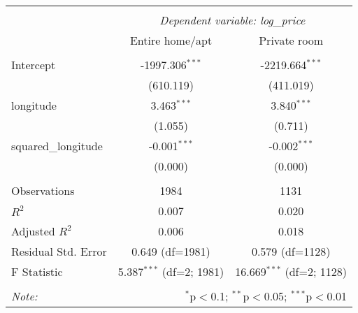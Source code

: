 \begin{table}[!htbp] \centering
\begin{tabular}{@{\extracolsep{5pt}}lcc}
\\[-1.8ex]\hline
\hline \\[-1.8ex]
& \multicolumn{2}{c}{\textit{Dependent variable: log_price}} \
\cr \cline{2-3}
\\[-1.8ex] & \multicolumn{1}{c}{Entire home/apt} & \multicolumn{1}{c}{Private room}  \\
\hline \\[-1.8ex]
 Intercept & -1997.306$^{***}$ & -2219.664$^{***}$ \\
& (610.119) & (411.019) \\
 longitude & 3.463$^{***}$ & 3.840$^{***}$ \\
& (1.055) & (0.711) \\
 squared_longitude & -0.001$^{***}$ & -0.002$^{***}$ \\
& (0.000) & (0.000) \\
\hline \\[-1.8ex]
 Observations & 1984 & 1131 \\
 $R^2$ & 0.007 & 0.020 \\
 Adjusted $R^2$ & 0.006 & 0.018 \\
 Residual Std. Error & 0.649 (df=1981) & 0.579 (df=1128) \\
 F Statistic & 5.387$^{***}$ (df=2; 1981) & 16.669$^{***}$ (df=2; 1128) \\
\hline
\hline \\[-1.8ex]
\textit{Note:} & \multicolumn{2}{r}{$^{*}$p$<$0.1; $^{**}$p$<$0.05; $^{***}$p$<$0.01} \\
\end{tabular}
\end{table}